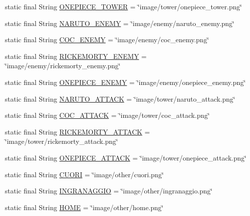 \begin{DoxyCompactItemize}
static final String \hyperlink{classhelpz_1_1_load_save_af65c28fec8cba0bdbc133b72e78c672c}{O\+N\+E\+P\+I\+E\+C\+E\+\_\+\+T\+O\+W\+ER} = \char`\"{}image/tower/onepiece\+\_\+tower.\+png\char`\"{}
\item 
static final String \hyperlink{classhelpz_1_1_load_save_a8c7fe33c0be889384305480a9ccb274f}{N\+A\+R\+U\+T\+O\+\_\+\+E\+N\+E\+MY} = \char`\"{}image/enemy/naruto\+\_\+enemy.\+png\char`\"{}
\item 
static final String \hyperlink{classhelpz_1_1_load_save_a238e327767eecaa236e0390d07899958}{C\+O\+C\+\_\+\+E\+N\+E\+MY} = \char`\"{}image/enemy/coc\+\_\+enemy.\+png\char`\"{}
\item 
static final String \hyperlink{classhelpz_1_1_load_save_ac8f4c46540cc4c56f78054c88a5117ca}{R\+I\+C\+K\+E\+M\+O\+R\+T\+Y\+\_\+\+E\+N\+E\+MY} = \char`\"{}image/enemy/rickemorty\+\_\+enemy.\+png\char`\"{}
\item 
static final String \hyperlink{classhelpz_1_1_load_save_a9818575a679c1797a506859b0c98c11d}{O\+N\+E\+P\+I\+E\+C\+E\+\_\+\+E\+N\+E\+MY} = \char`\"{}image/enemy/onepiece\+\_\+enemy.\+png\char`\"{}
\item 
static final String \hyperlink{classhelpz_1_1_load_save_a097b7546e4582973ef01057e11448bb8}{N\+A\+R\+U\+T\+O\+\_\+\+A\+T\+T\+A\+CK} = \char`\"{}image/tower/naruto\+\_\+attack.\+png\char`\"{}
\item 
static final String \hyperlink{classhelpz_1_1_load_save_aa62695e0c0c7e0a290f0b290c526acd0}{C\+O\+C\+\_\+\+A\+T\+T\+A\+CK} = \char`\"{}image/tower/coc\+\_\+attack.\+png\char`\"{}
\item 
static final String \hyperlink{classhelpz_1_1_load_save_a963d53a8f44641b429f317da197801b1}{R\+I\+C\+K\+E\+M\+O\+R\+T\+Y\+\_\+\+A\+T\+T\+A\+CK} = \char`\"{}image/tower/rickemorty\+\_\+attack.\+png\char`\"{}
\item 
static final String \hyperlink{classhelpz_1_1_load_save_a6fa6af643038a007889d96b4c8425ed8}{O\+N\+E\+P\+I\+E\+C\+E\+\_\+\+A\+T\+T\+A\+CK} = \char`\"{}image/tower/onepiece\+\_\+attack.\+png\char`\"{}
\item 
static final String \hyperlink{classhelpz_1_1_load_save_af99f50acd9c685e1090a922353326869}{C\+U\+O\+RI} = \char`\"{}image/other/cuori.\+png\char`\"{}
\item 
static final String \hyperlink{classhelpz_1_1_load_save_a16fc0f33bc0481ae3a939d239dc83b24}{I\+N\+G\+R\+A\+N\+A\+G\+G\+IO} = \char`\"{}image/other/ingranaggio.\+png\char`\"{}
\item 
static final String \hyperlink{classhelpz_1_1_load_save_a4718d9d067dbe4854d3094f98f601269}{H\+O\+ME} = \char`\"{}image/other/home.\+png\char`\"{}
\end{DoxyCompactItemize}
